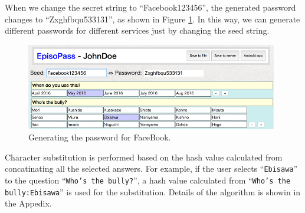 \documentclass{article}
\begin{document}

When we change the secret string to ``\textsf{Facebook123456}'',
the generated password changes to ``\textsf{Zxghfbqu533131}'',
as shown in Figure \ref{web2}.
In this way, we can generate different passwords for
different services just by changing the seed string.

\begin{figure}[H]
\includegraphics[width=110mm,bb=-30 0 800 285]{figures/0e2820c279afc70520482e0fc53b6ed9.png}
\caption{Generating the password for FaceBook.}
\label{web2}
\end{figure}



Character substitution is performed based on the hash value
calculated from concatinating all the selected answers.
For example, if the user selects ``\texttt{Ebisawa}'' to the question ``\texttt{Who's the bully?}'',
a hash value calculated from  ``\texttt{Who's the bully:Ebisawa}''
is used for the substitution.
Details of the algorithm is showin in the Appedix.


% 
% 
\end{document}
